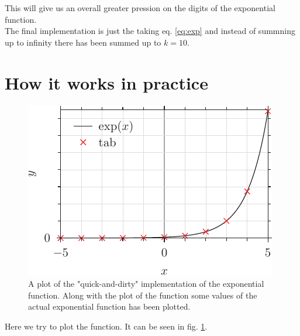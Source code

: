 \documentclass[twocolumn, a4paper]{article}
\begin{document}
This will give us an overall greater pression on the digits of the exponential function. \\

The final implementation is just the taking eq. \ref{eq:exp} and instead of summning up to infinity there has been summed up to $k = 10$.

\section{How it works in practice}

\begin{figure} \label{fig:exp_dirty}
	\includegraphics{exp_pyx.pdf}
	\caption{A plot of the "quick-and-dirty" implementation of the exponential function. Along with the plot of the function some values of the actual exponential function has been plotted.}
\end{figure}

Here we try to plot the function. It can be seen in fig. \ref{fig:exp_dirty}.
\end{document}

